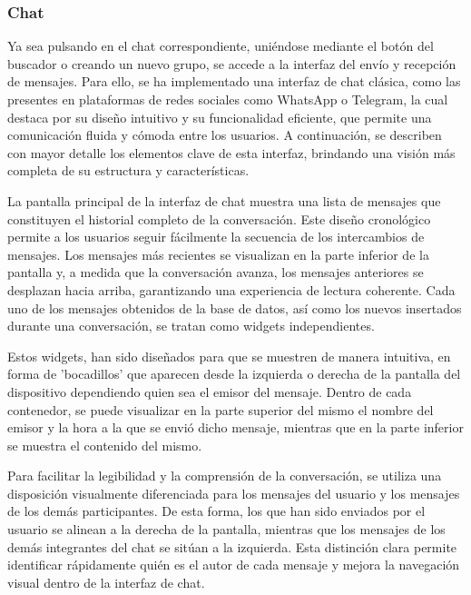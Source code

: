 \documentclass{article}
\begin{document}
\subsubsection{Chat}

Ya sea pulsando en el chat correspondiente, uniéndose mediante el botón del buscador o creando un nuevo grupo, se accede a la interfaz del envío y recepción de mensajes. Para ello, se ha implementado una interfaz de chat clásica, como las presentes en plataformas de redes sociales como WhatsApp o Telegram, la cual destaca por su diseño intuitivo y su funcionalidad eficiente, que permite una comunicación fluida y cómoda entre los usuarios. A continuación, se describen con mayor detalle los elementos clave de esta interfaz, brindando una visión más completa de su estructura y características.

La pantalla principal de la interfaz de chat muestra una lista de mensajes que constituyen el historial completo de la conversación. Este diseño cronológico permite a los usuarios seguir fácilmente la secuencia de los intercambios de mensajes. Los mensajes más recientes se visualizan en la parte inferior de la pantalla y, a medida que la conversación avanza, los mensajes anteriores se desplazan hacia arriba, garantizando una experiencia de lectura coherente. Cada uno de los mensajes obtenidos de la base de datos, así como los nuevos insertados durante una conversación, se tratan como widgets independientes.

\newpage

Estos widgets, han sido diseñados para que se muestren de manera intuitiva, en forma de 'bocadillos' que aparecen desde la izquierda o derecha de la pantalla del dispositivo dependiendo quien sea el emisor del mensaje. Dentro de cada contenedor, se puede visualizar en la parte superior del mismo el nombre del emisor y la hora a la que se envió dicho mensaje, mientras que en la parte inferior se muestra el contenido del mismo.

Para facilitar la legibilidad y la comprensión de la conversación, se utiliza una disposición visualmente diferenciada para los mensajes del usuario y los mensajes de los demás participantes. De esta forma, los que han sido enviados por el usuario se alinean a la derecha de la pantalla, mientras que los mensajes de los demás integrantes del chat se sitúan a la izquierda. Esta distinción clara permite identificar rápidamente quién es el autor de cada mensaje y mejora la navegación visual dentro de la interfaz de chat.
\end{document}
